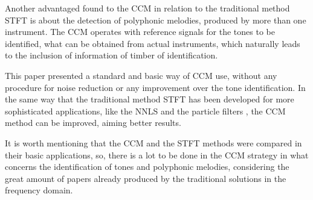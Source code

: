 \documentclass{article}
\begin{document}
	Another advantaged found to the CCM in relation to the traditional method STFT is about the detection of polyphonic melodies, produced by more than one instrument. The CCM operates with reference signals for the tones to be identified, what can be obtained from actual instruments, which naturally leads to the inclusion of information of timber of identification. 

	This paper presented a standard and basic way of CCM use, without any procedure for noise reduction or any improvement over the tone identification. In the same way that the traditional method STFT has been developed for more sophisticated applications, like the NNLS \cite{mauch2010approximate} and the particle filters \cite{jo2010melody}, the CCM method can be improved, aiming better results.
	
	It is worth mentioning that the CCM and the STFT methods were compared in their basic applications, so, there is a lot to be done in the CCM strategy in what concerns the identification of tones and polyphonic melodies, considering the great amount of papers already produced by the traditional solutions in the frequency domain. 




%
%
%
%
\end{document}
